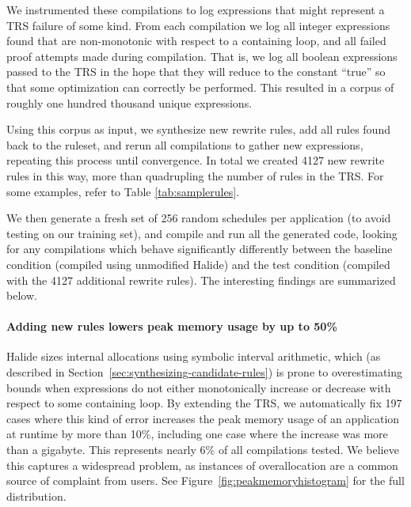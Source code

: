 \documentclass[acmsmall,review]{acmart}\settopmatter{printfolios=true,printccs=false,printacmref=false}
\begin{document}
We instrumented these compilations to log expressions that might represent a TRS failure of some kind. From each compilation we log all integer expressions found that are non-monotonic with respect to a containing loop, and all failed proof attempts made during compilation. That is, we log all boolean expressions passed to the TRS in the hope that they will reduce to the constant ``true'' so that some optimization can correctly be performed. This resulted in a corpus of roughly one hundred thousand unique expressions.

Using this corpus as input, we synthesize new rewrite rules, add all rules found back to the ruleset, and rerun all compilations to gather new expressions, repeating this process until convergence. In total we created 4127 new rewrite rules in this way, more than quadrupling the number of rules in the TRS. For some examples, refer to Table \ref{tab:samplerules}.

We then generate a fresh set of 256 random schedules per application (to avoid testing on our training set), and compile and run all the generated code, looking for any compilations which behave significantly differently between the baseline condition (compiled using unmodified Halide) and the test condition (compiled with the 4127 additional rewrite rules). The interesting findings are summarized below.

\paragraph{Adding new rules lowers peak memory usage by up to 50\%}
Halide sizes internal allocations using symbolic interval arithmetic,
which (as described in Section~\ref{sec:synthesizing-candidate-rules})
is prone to overestimating bounds when
expressions do not either monotonically increase or decrease with
respect to some containing loop. By extending the TRS, we
automatically fix 197 cases where this kind of error increases the
peak memory usage of an application at runtime by more than 10\%, including one
case where the increase was more than a gigabyte. This represents
nearly 6\% of all compilations tested. We believe this captures a
widespread problem, as instances of overallocation are a common source
of complaint from users. See Figure~\ref{fig:peakmemoryhistogram} for
the full distribution. 
\end{document}
